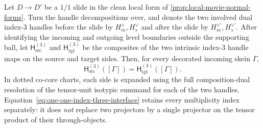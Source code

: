 \begin{lemma}
\label{lem:one-one-exact-interface}
Let $D\to D'$ be a $1/1$ slide in the clean local form of
\cref{prop:local-movie-normal-forms}.  Turn the handle decompositions over,
and denote the two involved dual index-$3$ handles before the slide by
$H_m^\vee,H_s^\vee$ and after the slide by
$H_m^{\vee\prime},H_s^{\vee\prime}$.  After identifying the incoming and
outgoing level boundaries outside the supporting ball, let
\(\mathsf H^{(3)}_{\mathrm{src}}\) and
\(\mathsf H^{(3)}_{\mathrm{tgt}}\) be the composites of the two intrinsic
index-$3$ handle maps on the source and target sides.  Then, for every
decorated incoming skein $\Gamma$,
\[
  \mathsf H^{(3)}_{\mathrm{src}}([\Gamma])
  =
  \mathsf H^{(3)}_{\mathrm{tgt}}([\Gamma]).
  \tag{3.4}\label{eq:one-one-index-three-interface}
\]
In dotted co-core charts, each side is expanded using the full
composition-dual resolution of the tensor-unit isotypic summand for each of
the two handles.  Equation~\eqref{eq:one-one-index-three-interface} retains
every multiplicity index separately: it does \emph{not} replace two
projectors by a single projector on the tensor product of their
through-objects.
\end{lemma}

